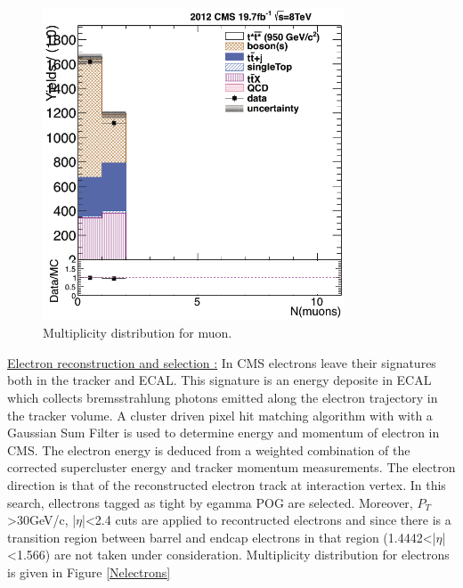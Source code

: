 \documentclass[12pt,oneandhalf,chaparabic,phys,ms,eng]{metu}
\begin{document}
\begin{itemize}
\begin{figure}[!hbt]
\centering
    \includegraphics[width=0.8\textwidth]{Nmuons}
    \caption{\label{Nmuons} Multiplicity distribution for muon.}
\end{figure}

\underline{Electron reconstruction and selection \cite{electron}:}
In CMS electrons leave their signatures both in the tracker and ECAL. This signature is an energy deposite in ECAL which collects bremsstrahlung photons emitted along
the electron trajectory in the tracker volume. A cluster driven pixel hit matching algorithm with with a Gaussian Sum Filter is used to determine energy and momentum of electron in CMS. The electron energy is deduced from a weighted combination of the corrected supercluster energy and tracker momentum measurements. The electron direction is that of the reconstructed electron track at interaction vertex. In this search, ellectrons tagged as tight by egamma POG are selected. Moreover,  $P_T$ >30GeV/c, |$\eta$|<2.4 cuts are applied to recontructed electrons and since there is a transition region between barrel and endcap electrons in that region (1.4442<|$\eta$|<1.566) are not taken under consideration. Multiplicity distribution for electrons is given in Figure \ref{Nelectrons} 


\end{itemize}
\end{document}
